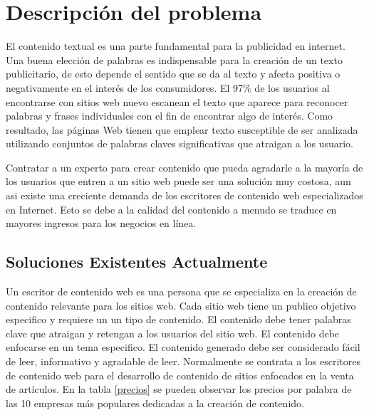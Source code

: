 
\chapter{Descripción del problema}

El contenido textual es una parte fundamental para la publicidad en internet. Una buena elección de palabras es indispensable para la creación de un texto publicitario, de esto depende el sentido que se da al texto y afecta positiva o negativamente en el interés de los consumidores. El 97\% de los usuarios al encontrarse con sitios web nuevo escanean el texto que aparece para reconocer palabras y frases individuales con el fin de encontrar algo de interés.\cite{nielsen1997users} Como resultado, las páginas Web tienen que emplear texto susceptible de ser analizada utilizando conjuntos de palabras claves significativas que atraigan a los usuario. 

Contratar a un experto para crear contenido que pueda agradarle a la mayoría de los usuarios que entren a un sitio web puede ser una solución muy costosa, aun asi existe una creciente demanda de los escritores de contenido web especializados en Internet. Esto se debe a la calidad del contenido a menudo se traduce en mayores ingresos para los negocios en línea.\cite{kulkarni2014choose}

\section{Soluciones Existentes Actualmente}

Un escritor de contenido web es una persona que se especializa en la creación de contenido relevante para los sitios web. Cada sitio web tiene un publico objetivo especifico y requiere un un tipo de contenido. El contenido debe tener palabras clave que atraigan y retengan a los usuarios del sitio web. El contenido debe enfocarse en un tema especifico. El contenido generado debe ser considerado fácil de leer, informativo y agradable de leer. Normalmente se contrata a los escritores de contenido web para el desarrollo de contenido de sitios enfocados en la venta de artículos. En la tabla \ref{precios} se pueden observar los precios por palabra de las 10 empresas más populares dedicadas a la creación de contenido.

